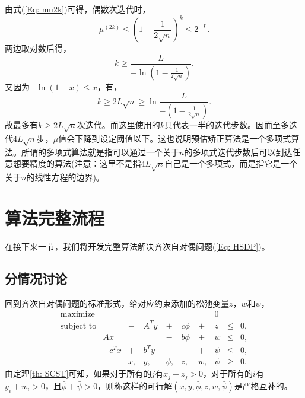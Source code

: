 \documentclass{ctexart}
\numberwithin{equation}{section} %
\begin{document}
由式(\ref{Eq: mu2k})可得，偶数次迭代时，
\begin{equation}
	\mu^{(2k)} \leq \left(1 - \frac{1}{2\sqrt{n}}\right)^k \leq 2^{-L}. \nonumber
\end{equation}
两边取对数后得，
\begin{equation}
	k \geq \frac{L}{-\ln\left(1 - \frac{1}{2\sqrt{n}}\right)}. \nonumber
\end{equation}
又因为$ -\ln\left(1 - x\right) \leq x $，有，
\begin{equation}
	k \geq 2L\sqrt{n} \geq \ln\frac{L}{-\left(1 - \frac{1}{2\sqrt{n}}\right)}. \nonumber
\end{equation}
故最多有$ k \geq 2L\sqrt{n} $次迭代。而这里使用的$ k $只代表一半的迭代步数。因而至多迭代$ 4L\sqrt{n} $步，$ \mu $值会下降到设定阈值以下。这也说明预估矫正算法是一个多项式算法。所谓的多项式算法就是指可以通过一个关于$ n $的多项式迭代步数后可以到达任意想要精度的算法(注意：这里不是指$ 4L\sqrt{n} $自己是一个多项式，而是指它是一个关于$ n $的线性方程的边界)。

\section{算法完整流程}

在接下来一节，我们将开发完整算法解决齐次自对偶问题(\ref{Eq: HSDP})。
\subsection{分情况讨论}

回到齐次自对偶问题的标准形式，给对应约束添加的松弛变量$ z $，$ w $和$ \psi $，
\begin{equation}
	\label{Eq: slackedHSDP}
	\begin{array}{crrrrrrrcc}
	\textrm{maximize} & & & & & & & 0 & &  \\
	\textrm{subject to} & & - \  & A^{T}y \  & + \  & c\phi \  & + \  & z & \leq & 0, \\
	& Ax  & & & - \  & b\phi \  & + \  & w & \leq & 0, \\
	& -c^{T}x & + \  & b^{T}y \  & & & + \  & \psi & \leq & 0, \\
	& & x, & y, & \phi, & z, & w, & \psi & \geq & 0.
	\end{array}
\end{equation}
由定理\ref{th:  SCST}可知，如果对于所有的$ j $有$ \bar{x}_j + \bar{z}_j > 0 $，对于所有的$ i $有$ \bar{y}_i + \bar{w}_i > 0 $，且$ \bar{\phi} + \bar{\psi} > 0 $，则称这样的可行解$ \left(\bar{x}, \bar{y}, \bar{\phi}, \bar{z}, \bar{w}, \bar{\psi}\right) $是严格互补的。
\end{document}
